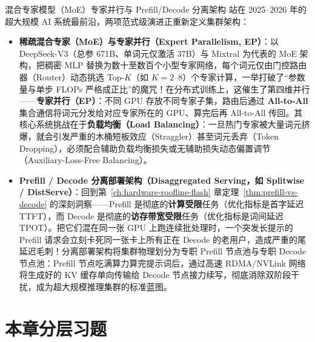 \begin{extBox}{混合专家模型（MoE）专家并行与 Prefill/Decode 分离架构}
站在 2025--2026 年的超大规模 AI 系统最前沿，两项范式级演进正重新定义集群架构：
\begin{itemize}
  \item \textbf{稀疏混合专家（MoE）与专家并行（Expert Parallelism, EP）}：以 DeepSeek-V3（总参 671B、单词元仅激活 37B）与 Mixtral 为代表的 MoE 架构，把稠密 MLP 替换为数十至数百个小型专家网络，每个词元仅由门控路由器（Router）动态挑选 Top-$K$（如 $K = 2\text{--}8$）个专家计算，一举打破了“参数量与单步 FLOPs 严格成正比”的魔咒！在分布式训练上，这催生了第四维并行——\textbf{专家并行（EP）}：不同 GPU 存放不同专家子集，路由后通过 \textbf{All-to-All} 集合通信将词元分发给对应专家所在的 GPU、算完后再 All-to-All 传回。其核心系统挑战在于\textbf{负载均衡（Load Balancing）}：一旦热门专家被大量词元挤爆，就会引发严重的木桶短板效应（Straggler）甚至词元丢弃（Token Dropping），必须配合辅助负载均衡损失或无辅助损失动态偏置调节（Auxiliary-Loss-Free Balancing）。
  \item \textbf{Prefill / Decode 分离部署架构（Disaggregated Serving，如 Splitwise / DistServe）}：回到第~\ref{ch:hardware-roofline-flash} 章定理~\ref{thm:prefill-vs-decode} 的深刻洞察——Prefill 是彻底的\textbf{计算受限}任务（优化指标是首字延迟 TTFT），而 Decode 是彻底的\textbf{访存带宽受限}任务（优化指标是词间延迟 TPOT）。把它们混在同一张 GPU 上跑连续批处理时，一个突发长提示的 Prefill 请求会立刻卡死同一张卡上所有正在 Decode 的老用户，造成严重的尾延迟毛刺！分离部署架构将集群物理划分为专职 Prefill 节点池与专职 Decode 节点池：Prefill 节点吃满算力算完提示词后，通过高速 RDMA/NVLink 网络将生成好的 KV 缓存单向传输给 Decode 节点接力续写，彻底消除双阶段干扰，成为超大规模推理集群的标准蓝图。
\end{itemize}
\end{extBox}

\section*{本章分层习题}


